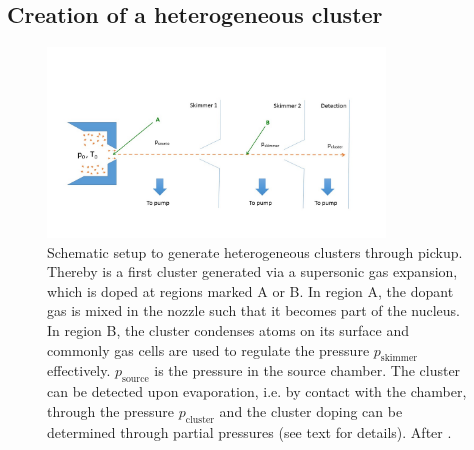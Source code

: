 \subsection{Creation of a heterogeneous cluster}\label{sec:heterogeneous-cluster}
\begin{figure}
	\centering
		\includegraphics[width=0.80\textwidth]{images/pick-up.jpg}
	\caption[Schematic of a pickup (gas-)source.]{Schematic setup to generate heterogeneous clusters through pickup. Thereby is a first cluster generated via a supersonic gas expansion, which is doped at regions marked A or B. In region A, the dopant gas is mixed in the nozzle such that it becomes part of the nucleus. In region B, the cluster condenses atoms on its surface and commonly gas cells are used to regulate the pressure $p_{\text{skimmer}}$ effectively. $p_{\text{source}}$ is the pressure in the source chamber. The cluster can be detected upon evaporation, i.e. by contact with the chamber, through the pressure $p_{\text{cluster}}$ and the cluster doping can be determined through partial pressures (see text for details). After \cite{Gough-1985-JChemPhys,Haberland-1994-Springer}.}
	\label{fig:pickupPrinciple}
\end{figure}
